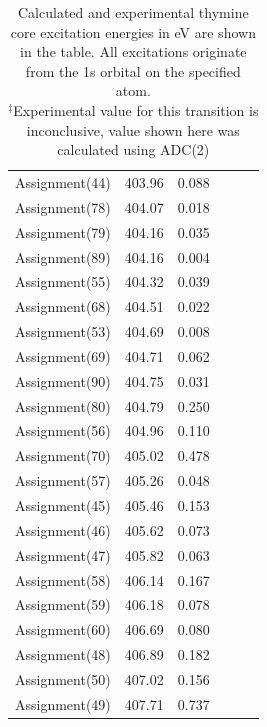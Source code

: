 \documentclass[11.5pt]{article}
\begin{document}
\begin{table}
\begin{tabular}{c@{\hskip 0.22in}c@{\hskip 0.22in}c@{\hskip 0.52in}c@{\hskip 0.22in}c@{\hskip 0.22in}c}
 Assignment(44) & 403.96 & 0.088 \\
 Assignment(78) & 404.07 & 0.018 \\
 Assignment(79) & 404.16 & 0.035 \\
 Assignment(89) & 404.16 & 0.004 \\
 Assignment(55) & 404.32 & 0.039 \\
 Assignment(68) & 404.51 & 0.022 \\
 Assignment(53) & 404.69 & 0.008 \\
 Assignment(69) & 404.71 & 0.062 \\
 Assignment(90) & 404.75 & 0.031 \\
 Assignment(80) & 404.79 & 0.250 \\
 Assignment(56) & 404.96 & 0.110 \\
 Assignment(70) & 405.02 & 0.478 \\
 Assignment(57) & 405.26 & 0.048 \\
 Assignment(45) & 405.46 & 0.153 \\
 Assignment(46) & 405.62 & 0.073 \\
 Assignment(47) & 405.82 & 0.063 \\
 Assignment(58) & 406.14 & 0.167 \\
 Assignment(59) & 406.18 & 0.078 \\
 Assignment(60) & 406.69 & 0.080 \\
 Assignment(48) & 406.89 & 0.182 \\
 Assignment(50) & 407.02 & 0.156 \\
 Assignment(49) & 407.71 & 0.737 \\
    \end{tabular}
      \caption{Calculated and experimental thymine core excitation energies in eV are shown in the table. All excitations originate from the 1s orbital on the specified atom. \\
  $^{\ddagger}$Experimental value for this transition is inconclusive, value shown here was calculated using ADC(2)}
  \label{figure:MOs}
  \end{table}
\end{document}
